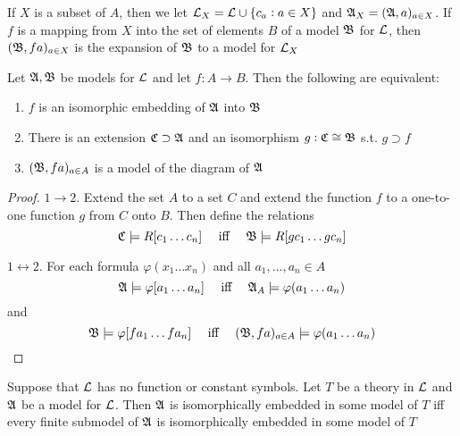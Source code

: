 \documentclass[11pt]{article}
\begin{document}
If \(X\) is a subset of \(A\), then we let \(\mathcal{L}_X=\mathcal{L}\cup\{c_a:a\in
   X\}\) and \(\mathfrak{A}_X=(\mathfrak{A},a)_{a\in X}\). If \(f\) is a mapping from \(X\) into
the set of elements \(B\) of a model \(\mathfrak{B}\) for \(\mathcal{L}\), then
\((\mathfrak{B},fa)_{a\in X}\) is the expansion of \(\mathfrak{B}\) to a model for \(\mathcal{L}_X\)

\begin{proposition}[]
\label{prop2.1.8}
Let \(\mathfrak{A},\mathfrak{B}\) be models for \(\mathcal{L}\) and let \(f:A\to B\). Then the
following are equivalent:
\begin{enumerate}
\item \(f\) is an isomorphic embedding of \(\mathfrak{A}\) into \(\mathfrak{B}\)
\item There is an extension \(\mathfrak{C}\supset\mathfrak{A}\) and an isomorphism
\(g:\mathfrak{C}\cong\mathfrak{B}\) s.t. \(g\supset f\)
\item \((\mathfrak{B},fa)_{a\in A}\) is a model of the diagram of \(\mathfrak{A}\)
\end{enumerate}
\end{proposition}

\begin{proof}
\(1\to2\). Extend the set \(A\) to a set \(C\) and extend the function \(f\)
to a one-to-one function \(g\) from \(C\) onto \(B\). Then define the
relations
\begin{equation*}
\mathfrak{C}\models R[c_1\dots c_n] \quad\text{ iff }\quad
\mathfrak{B}\models R[gc_1\dots gc_n]
\end{equation*}

\(1\leftrightarrow2\). For each formula \(\varphi(x_1\dots x_n)\) and all
\(a_1,\dots,a_n\in A\)
\begin{equation*}
\mathfrak{A}\models\varphi[a_1\dots a_n] \quad\text{ iff }\quad
\mathfrak{A}_A\models\varphi(a_1\dots a_n)
\end{equation*}
and
\begin{equation*}
\mathfrak{B}\models\varphi[fa_1\dots fa_n] \quad\text{ iff }\quad
(\mathfrak{B},fa)_{a\in A}\models\varphi(a_1\dots a_n)
\end{equation*}
\end{proof}

\begin{corollary}[]
Suppose that \(\mathcal{L}\) has no function or constant symbols. Let \(T\) be a
theory in \(\mathcal{L}\) and \(\mathfrak{A}\) be a model for \(\mathcal{L}\). Then \(\mathfrak{A}\) is
isomorphically embedded in some model of \(T\) iff every finite submodel of
\(\mathfrak{A}\) is isomorphically embedded in some model of \(T\)
\end{corollary}
\end{document}
